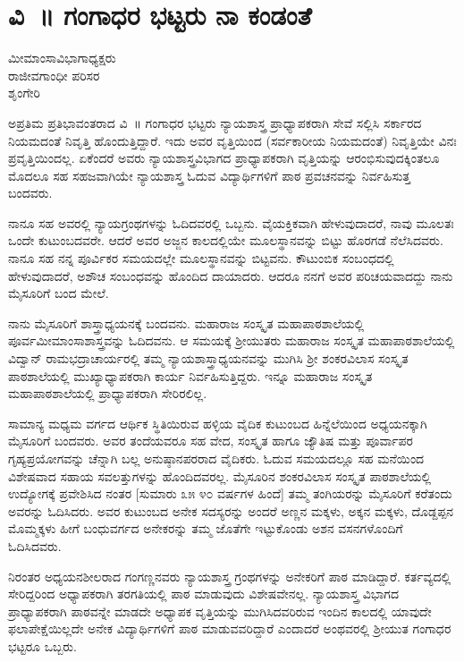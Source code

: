 {\fontsize{14}{16}\selectfont
\chapter{ವಿ~॥ ಗಂಗಾಧರ ಭಟ್ಟರು ನಾ ಕಂಡಂತೆ}

\begin{center}
\smallskip

ಮೀಮಾಂಸಾವಿಭಾಗಾಧ್ಯಕ್ಷರು\\   
ರಾಜೀವಗಾಂಧೀ ಪರಿಸರ\\
ಶೃಂಗೇರಿ
\addrule	
\end{center}

ಅಪ್ರತಿಮ ಪ್ರತಿಭಾವಂತರಾದ ವಿ~॥ ಗಂಗಾಧರ ಭಟ್ಟರು ನ್ಯಾಯಶಾಸ್ತ್ರ ಪ್ರಾಧ್ಯಾಪಕರಾಗಿ ಸೇವೆ ಸಲ್ಲಿಸಿ ಸರ್ಕಾರದ ನಿಯಮದಂತೆ ನಿವೃತ್ತಿ ಹೊಂದುತ್ತಿದ್ದಾರೆ. ಇದು ಅವರ ವೃತ್ತಿಯಿಂದ (ಸರ್ವಕಾರೀಯ ನಿಯಮದಂತೆ) ನಿವೃತ್ತಿಯೇ ವಿನಃ ಪ್ರವೃತ್ತಿಯಿಂದಲ್ಲ. ಏಕೆಂದರೆ   \enginline{-}   ಅವರು ನ್ಯಾಯಶಾಸ್ತ್ರವಿಭಾಗದ ಪ್ರಾಧ್ಯಾಪಕರಾಗಿ ವೃತ್ತಿಯನ್ನು ಆರಂಭಿಸುವುದಕ್ಕಿಂತಲೂ ಮೊದಲೂ ಸಹ ಸಹಜವಾಗಿಯೇ ನ್ಯಾಯಶಾಸ್ತ್ರ ಓದುವ ವಿದ್ಯಾರ್ಥಿಗಳಿಗೆ ಪಾಠ  \enginline{-}  ಪ್ರವಚನವನ್ನು ನಿರ್ವಹಿಸುತ್ತ ಬಂದವರು.

ನಾನೂ ಸಹ ಅವರಲ್ಲಿ ನ್ಯಾಯಗ್ರಂಥಗಳನ್ನು ಓದಿದವರಲ್ಲಿ ಒಬ್ಬನು. ವೈಯಕ್ತಿಕವಾಗಿ ಹೇಳುವುದಾದರೆ, ನಾವು ಮೂಲತಃ ಒಂದೇ ಕುಟುಂಬದವರೇ. ಆದರೆ ಅವರ ಅಜ್ಜನ ಕಾಲದಲ್ಲಿಯೇ ಮೂಲಸ್ಥಾನವನ್ನು ಬಿಟ್ಟು ಹೊರಗಡೆ ನೆಲೆಸಿದವರು. ನಾನೂ ಸಹ ನನ್ನ ಪೂರ್ವಿಕರ ಸಮಯದಲ್ಲೇ ಮೂಲಸ್ಥಾನವನ್ನು ಬಿಟ್ಟವನು. ಕೌಟುಂಬಿಕ ಸಂಬಂಧದಲ್ಲಿ ಹೇಳುವುದಾದರೆ, ಅಶೌಚ ಸಂಬಂಧವನ್ನು ಹೊಂದಿದ ದಾಯಾದರು. ಆದರೂ ನನಗೆ ಅವರ ಪರಿಚಯವಾದದ್ದು ನಾನು ಮೈಸೂರಿಗೆ ಬಂದ ಮೇಲೆ.

ನಾನು ಮೈಸೂರಿಗೆ ಶಾಸ್ತ್ರಾಧ್ಯಯನಕ್ಕೆ ಬಂದವನು. ಮಹಾರಾಜ ಸಂಸ್ಕೃತ ಮಹಾಪಾಠಶಾಲೆಯಲ್ಲಿ ಪೂರ್ವಮೀಮಾಂಸಾಶಾಸ್ತ್ರವನ್ನು ಓದಿದವನು. ಆ ಸಮಯಕ್ಕೆ ಶ್ರೀಯುತರು ಮಹಾರಾಜ ಸಂಸ್ಕೃತ ಮಹಾಪಾಠಶಾಲೆಯಲ್ಲಿ ವಿದ್ವಾನ್ ರಾಮಭದ್ರಾಚಾರ್ಯರಲ್ಲಿ ತಮ್ಮ ನ್ಯಾಯಶಾಸ್ತ್ರಾಧ್ಯಯನವನ್ನು ಮುಗಿಸಿ ಶ್ರೀ ಶಂಕರವಿಲಾಸ ಸಂಸ್ಕೃತ ಪಾಠಶಾಲೆಯಲ್ಲಿ ಮುಖ್ಯಾಧ್ಯಾಪಕರಾಗಿ ಕಾರ್ಯ ನಿರ್ವಹಿಸುತ್ತಿದ್ದರು. ಇನ್ನೂ ಮಹಾರಾಜ ಸಂಸ್ಕೃತ ಮಹಾಪಾಠಶಾಲೆಯಲ್ಲಿ ಪ್ರಾಧ್ಯಾಪಕರಾಗಿ ಸೇರಿರಲಿಲ್ಲ.

ಸಾಮಾನ್ಯ ಮಧ್ಯಮ ವರ್ಗದ ಆರ್ಥಿಕ ಸ್ಥಿತಿಯಿರುವ ಹಳ್ಳಿಯ ವೈದಿಕ ಕುಟುಂಬದ ಹಿನ್ನೆಲೆಯಿಂದ ಅಧ್ಯಯನಕ್ಕಾಗಿ ಮೈಸೂರಿಗೆ ಬಂದವರು. ಅವರ ತಂದೆಯವರೂ ಸಹ ವೇದ, ಸಂಸ್ಕೃತ ಹಾಗೂ ಜ್ಯೌತಿಷ ಮತ್ತು ಪೂರ್ವಾಪರ ಗೃಹ್ಯಪ್ರಯೋಗವನ್ನು ಚೆನ್ನಾಗಿ ಬಲ್ಲ ಅನುಷ್ಠಾನಪರರಾದ ವೈದಿಕರು. ಓದುವ ಸಮಯದಲ್ಲೂ ಸಹ ಮನೆಯಿಂದ ವಿಶೇಷವಾದ ಸಹಾಯ  \enginline{-}  ಸವಲತ್ತುಗಳನ್ನು ಹೊಂದಿದವರಲ್ಲ. ಮೈಸೂರಿನ ಶಂಕರವಿಲಾಸ ಸಂಸ್ಕೃತ ಪಾಠಶಾಲೆಯಲ್ಲಿ ಉದ್ಯೋಗಕ್ಕೆ ಪ್ರವೇಶಿಸಿದ ನಂತರ [ಸುಮಾರು ೩೫  \enginline{-}  ೪೦ ವರ್ಷಗಳ ಹಿಂದೆ] ತಮ್ಮ ತಂಗಿಯರನ್ನು ಮೈಸೂರಿಗೆ ಕರೆತಂದು ಅವರನ್ನು ಓದಿಸಿದರು. ಅವರ ಕುಟುಂಬದ ಅನೇಕ ಸದಸ್ಯರನ್ನು ಅಂದರೆ ಅಣ್ಣನ ಮಕ್ಕಳು, ಅಕ್ಕನ ಮಕ್ಕಳು, ದೊಡ್ದಪ್ಪನ ಮೊಮ್ಮಕ್ಕಳು ಹೀಗೆ ಬಂಧುವರ್ಗದ ಅನೇಕರನ್ನು ತಮ್ಮ ಜೊತೆಗೇ ಇಟ್ಟುಕೊಂಡು ಅಶನ  \enginline{-}  ವಸನಗಳೊಂದಿಗೆ ಓದಿಸಿದವರು.

ನಿರಂತರ ಅಧ್ಯಯನಶೀಲರಾದ ಗಂಗಣ್ಣನವರು ನ್ಯಾಯಶಾಸ್ತ್ರ ಗ್ರಂಥಗಳನ್ನು ಅನೇಕರಿಗೆ ಪಾಠ ಮಾಡಿದ್ದಾರೆ. ಕರ್ತವ್ಯದಲ್ಲಿ ಸೇರಿದ್ದರಿಂದ ಅಧ್ಯಾಪಕರಾಗಿ ತರಗತಿಯಲ್ಲಿ ಪಾಠ ಮಾಡುವುದು ವಿಶೇಷವೇನಲ್ಲ. ನ್ಯಾಯಶಾಸ್ತ್ರ ವಿಭಾಗದ ಪ್ರಾಧ್ಯಾಪಕರಾಗಿ ಪಾಠವನ್ನೇ ಮಾಡದೇ ಅಧ್ಯಾಪಕ ವೃತ್ತಿಯನ್ನು ಮುಗಿಸಿದವರಿರುವ ಇಂದಿನ ಕಾಲದಲ್ಲಿ ಯಾವುದೇ ಫಲಾಪೇಕ್ಷೆಯಿಲ್ಲದೇ ಅನೇಕ ವಿದ್ಯಾರ್ಥಿಗಳಿಗೆ ಪಾಠ ಮಾಡುವವರಿದ್ದಾರೆ ಎಂದಾದರೆ ಅಂಥವರಲ್ಲಿ ಶ್ರೀಯುತ ಗಂಗಾಧರ ಭಟ್ಟರೂ ಒಬ್ಬರು.

}

